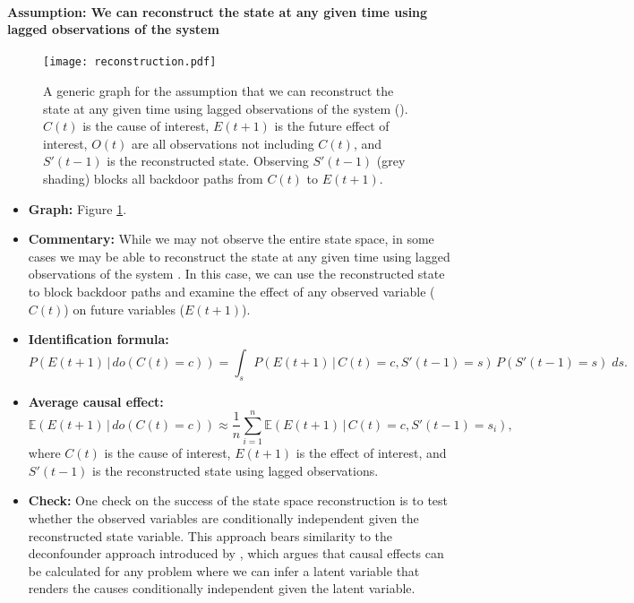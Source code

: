 \documentclass[12pt]{article}
\begin{document}
\newpage

\paragraph{Assumption: We can reconstruct the state at any given time
  using lagged observations of the system}

\begin{figure} \texttt{[image: reconstruction.pdf]}
  \caption{A generic graph for the assumption that we can reconstruct
    the state at any given time using lagged observations of the
    system (). $C(t)$ is the cause of interest, $E(t+1)$ is the future
    effect of interest, $O(t)$ are all observations not including
    $C(t)$, and $S'(t-1)$ is the reconstructed state. Observing
    $S'(t-1)$ (grey shading) blocks all backdoor paths from $C(t)$ to
    $E(t+1)$.}
  \label{fig:reconstruction}
\end{figure}

\begin{itemize}
\item \textbf{Graph:} Figure \ref{fig:reconstruction}.
\item \textbf{Commentary:} While we may not observe the entire state
  space, in some cases we may be able to reconstruct the state at any
  given time using lagged observations of the system \citep[see
  Takens' theorem,][]{takens1981detecting}. In this case, we can use
  the reconstructed state to block backdoor paths and examine the
  effect of any observed variable ($C(t)$) on future variables ($E(t+1)$).
\item \textbf{Identification formula:}
  \begin{equation*}
    P(E(t+1) \, | \, do(C(t) = c)) = \int_{s} P(E(t+1) \, | \, C(t) = c,
    S'(t-1) = s) \, P(S'(t-1)=s) \; d s.
  \end{equation*}
\item \textbf{Average causal effect:}
  \begin{equation*}
    \mathbb{E}(E(t+1) \, | \, do(C(t) = c)) \approx \frac{1}{n}
    \sum_{i=1}^n \mathbb{E}(E(t+1) \, | \, C(t)=c, S'(t-1)=s_i),
  \end{equation*}
  where $C(t)$ is the cause of interest, $E(t+1)$ is the effect of
  interest, and $S'(t-1)$ is the reconstructed state using lagged
  observations.
\item \textbf{Check:} One check on the success of the state space
  reconstruction is to test whether the observed variables are
  conditionally independent given the reconstructed state
  variable. This approach bears similarity to the deconfounder
  approach introduced by \cite{yixin-2019}, which argues that causal
  effects can be calculated for any problem where we can infer a
  latent variable that renders the causes conditionally independent
  given the latent variable.
\end{itemize}
\end{document}
